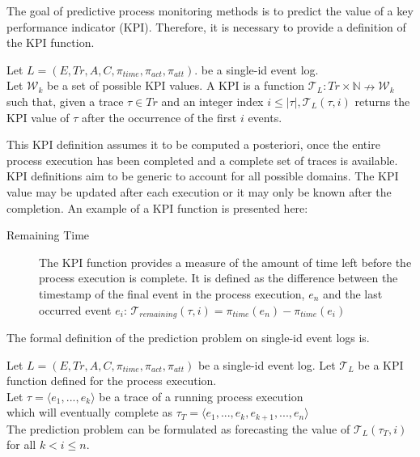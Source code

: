         The goal of predictive process monitoring methods is to predict the value of a key performance indicator (KPI). Therefore, it is necessary to provide a definition of the KPI function.

        \begin{definition}
        \label{def:sing_id_kpi}
            Let $L = (E, Tr, A, C, \pi_{time}, \pi_{act}, \pi_{att})$. be a single-id event log.\\ 
            Let $\mathcal{W}_k$ be a set of possible KPI values.
            A KPI is a function $\mathcal{T}_L: Tr\times \mathbb{N} \nrightarrow \mathcal{W}_k$ such that, given a trace $\tau\in Tr$ and an integer index $i\leq|\tau|, \mathcal{T}_L(\tau, i)$ returns the KPI value of $\tau$ after the occurrence of the first $i$ events.
        \end{definition}
        
        This KPI definition assumes it to be computed a posteriori, once the entire process execution has been completed and a complete set of traces is available. KPI definitions aim to be generic to account for all possible domains. The KPI value may be updated after each execution or it may only be known after the completion. An example of a KPI function is presented here:

        \begin{description}
            \item[Remaining Time] The KPI function provides a measure of the amount of time left before the process execution is complete. It is defined as the difference between the timestamp of the final event in the process execution, $e_n$ and the last occurred event $e_i$: $\mathcal{T}_{remaining}(\tau,i) = \pi_{time}(e_n)-\pi_{time}(e_i)$
        \end{description}
        
        The formal definition of the prediction problem on single-id event logs is.

        \begin{definition}
        \label{def:sing_id_pred_prob}
        Let $L = (E, Tr, A, C, \pi_{time}, \pi_{act}, \pi_{att})$ be a single-id event log.
        Let $\mathcal{T}_L$ be a KPI function defined for the process execution.\\
        Let $\tau=\langle e_1,...,e_k \rangle$ be a trace of a running process execution\\ which will eventually complete as $\tau_T=\langle e_1,...,e_k,e_{k+1},...,e_n \rangle$\\
        The prediction problem can be formulated as forecasting the value of $\mathcal{T}_L(\tau_T,i)$ for all $k<i\leq n$.
        \end{definition}
        
